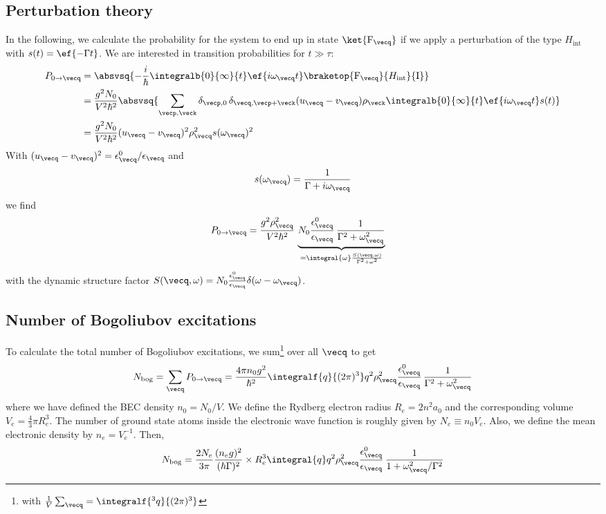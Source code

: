 \subsection{Perturbation theory}
In the following, we calculate the probability for the system to end up in state $\ket{\text{F}_{\vecq}}$ if we apply a perturbation of the type $H_\text{int}$ with $s(t)=\ef{-\Gamma t}$. We are interested in transition probabilities for $t\gg \tau$:
\begin{align}
P_{0\rightarrow\vecq}&=\absvsq{-\frac{i}{\hbar}\integralb{0}{\infty}{t}\ef{i\omega_{\vecq}t}\braketop{\text{F}_{\vecq}}{H_\text{int}}{\text{I}}}\\
&=\frac{g^2 N_0}{V^2\hbar^2}\absvsq{\sum_{\vecp,\veck}\delta_{\vecp,0} \, \delta_{\vecq,\vecp+\veck} (u_{\vecq}-v_{\vecq}) \rho_{\veck}\integralb{0}{\infty}{t}\ef{i\omega_{\vecq}t}s(t)}\\
&=\frac{g^2 N_0}{V^2\hbar^2} (u_{\vecq}-v_{\vecq})^2 \rho_{\vecq}^2 s(\omega_{\vecq})^2
\end{align}
With $(u_{\vecq}-v_{\vecq})^2=\epsilon^0_{\vecq}/\epsilon_{\vecq}$ and
\begin{align}
s(\omega_{\vecq})=\frac{1}{\Gamma+i\omega_{\vecq}}
\end{align}
we find
\begin{align}
P_{0\rightarrow\vecq}&=\frac{g^2\rho_{\vecq}^2}{V^2\hbar^2}\, \underbrace{N_0\frac{\epsilon^0_{\vecq}}{\epsilon_{\vecq}} \, \frac{1}{\Gamma^2+\omega_{\vecq}^2}}_{=\integral{\omega}\frac{S(\vecq,\omega)}{\Gamma^2+\omega^2}}
\end{align}
with the dynamic structure factor $S(\vecq,\omega)=N_0 \frac{\epsilon^0_{\vecq}}{\epsilon_{\vecq}} \delta(\omega-\omega_{\vecq})$.
\subsection{Number of Bogoliubov excitations}
To calculate the total number of Bogoliubov excitations, we sum\footnote{with $\frac{1}{V}\sum_{\vecq}=\integralf{^3 q}{(2\pi)^3}$} over all $\vecq$ to get
\begin{align}
N_\text{bog}=\sum_{\vecq}P_{0\rightarrow\vecq}=\frac{4\pi n_0 g^2}{\hbar^2} \integralf{q}{(2\pi)^3} q^2\rho_{\vecq}^2\frac{\epsilon^0_{\vecq}}{\epsilon_{\vecq}} \, \frac{1}{\Gamma^2+\omega_{\vecq}^2}
\end{align}
where we have defined the BEC density $n_0=N_0/V$. We define the Rydberg electron radius $R_e=2n^2 a_0$ and the corresponding volume $V_e=\frac{4}{3}\pi R_e^3$. The number of ground state atoms inside the electronic wave function is roughly given by $N_e\equiv n_0 V_e$. Also, we define the mean electronic density by $n_e=V_e^{-1}$. Then,
\begin{align}
N_\text{bog}=\frac{2N_e}{3\pi} \frac{(n_e g)^2}{(\hbar\Gamma)^2} \times R_e^3 \integral{q} q^2\rho_{\vecq}^2\frac{\epsilon^0_{\vecq}}{\epsilon_{\vecq}} \, \frac{1}{1+\omega_{\vecq}^2/\Gamma^2}
\end{align}

